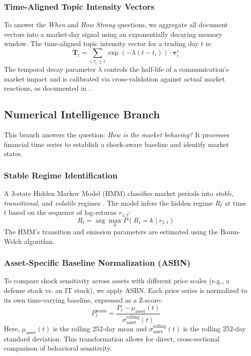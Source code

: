 \documentclass[11pt]{article}
\begin{document}
\subsubsection{Time-Aligned Topic Intensity Vectors}
To answer the \textit{When} and \textit{How Strong} questions, we aggregate all document vectors into a market-day signal using an exponentially decaying memory window. The time-aligned topic intensity vector for a trading day $t$ is:
\begin{equation}
\mathbf{T}_t = \sum_{i: t_i \leq t} \exp(-\lambda(t - t_i)) \cdot \boldsymbol{\tau}_i^s
\label{eq:time_aligned}
\end{equation}
The temporal decay parameter $\lambda$ controls the half-life of a communication's market impact and is calibrated via cross-validation against actual market reactions, as documented in \cite{srivastava2019}.

\subsection{Numerical Intelligence Branch}
This branch answers the question: \textit{How is the market behaving?} It processes financial time series to establish a shock-aware baseline and identify market states.

\subsubsection{Stable Regime Identification}
A 3-state Hidden Markov Model (HMM) classifies market periods into \textit{stable}, \textit{transitional}, and \textit{volatile} regimes \cite{kumar2024}. The model infers the hidden regime $R_t$ at time $t$ based on the sequence of log-returns $r_{1:t}$:
\begin{equation}
R_t = \arg\max_k P(R_t = k \mid r_{1:t})
\label{eq:hmm_regime}
\end{equation}
The HMM's transition and emission parameters are estimated using the Baum-Welch algorithm.

\subsubsection{Asset-Specific Baseline Normalization (ASBN)}
To compare shock sensitivity across assets with different price scales (e.g., a defense stock vs. an IT stock), we apply ASBN. Each price series is normalized to its own time-varying baseline, expressed as a Z-score:
\begin{equation}
P_t^{\text{norm}} = \frac{P_t - \mu_{\text{asset}}(t)}{\sigma_{\text{asset}}^{\text{rolling}}(t)}
\label{eq:asbn}
\end{equation}
Here, $\mu_{\text{asset}}(t)$ is the rolling 252-day mean and $\sigma_{\text{asset}}^{\text{rolling}}(t)$ is the rolling 252-day standard deviation. This transformation allows for direct, cross-sectional comparison of behavioral sensitivity.
\end{document}

